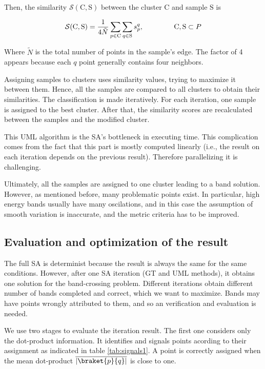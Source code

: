 \documentclass[a4paper,12pt]{report}
\begin{document}
\begin{appendices}
Then, the similarity $\mathcal{S}(\mathrm{C},\mathrm{S})$ between the cluster $\mathrm{C}$ and sample $\mathrm{S}$  is

\begin{equation}
    \mathcal{S}(\mathrm{C},\mathrm{S}) = \frac{1}{4\tilde{N}}\sum_{p\in \mathrm{C}}\sum_{q\in\mathrm{S}} s_p^q,\hspace{1.5cm}\mathrm{C},\mathrm{S}\subset P
\end{equation}

Where $\tilde{N}$ is the total number of points in the sample's edge. The factor of 4 appears because each $q$ point generally contains four neighbors.

Assigning samples to clusters uses similarity values, trying to maximize it between them.
Hence, all the samples are compared to all clusters to obtain their similarities. The classification is made iteratively. For each iteration, one sample is assigned to the best cluster. After that, the similarity scores are recalculated between the samples and the modified cluster.

This UML algorithm is the SA's bottleneck in executing time. This complication comes from the fact that this part is mostly computed linearly (i.e., the result on each iteration depends on the previous result). Therefore parallelizing it is challenging.

Ultimately, all the samples are assigned to one cluster leading to a band solution.
However, as mentioned before, many problematic points exist.
In particular, high energy bands usually have many oscilations, and in this case the assumption of smooth variation is inaccurate, and the metric criteria has to be improved.





\subsection{Evaluation and optimization of the result}
The full SA is determinist because the result is always the same for the same conditions. However, after one SA iteration (GT and UML methods), it obtains one solution for the band-crossing problem.
Different iterations obtain different number of bands completed and correct, which we want to maximize.
Bands may have points wrongly attributed to them, and so an verification and evaluation is needed.

We use two stages to evaluate the iteration result.
The first one considers only the dot-product information.
It identifies and signals points acording to their assignment as indicated in table \ref{tab:signals1}.
A point is correctly assigned when the mean dot-product $\overline{\left|\braket{p}{q}\right|}$ is close to one.


\end{appendices}
\end{document}
